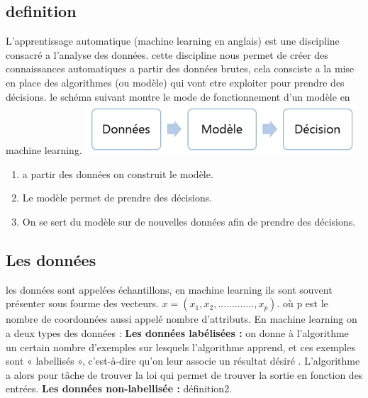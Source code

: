 \documentclass[a4paper,12pt]{report}
\begin{document}
\subsection*{definition}
L'apprentissage automatique (machine learning en anglais) est une discipline consacré a l'analyse des données. cette discipline nous permet de créer des connaissances automatiques a partir des données brutes, cela consciste a la mise en place des algorithmes (ou modèle) qui vont etre exploiter pour prendre des décisions.\newline
le schéma suivant montre le mode de fonctionnement d'un modèle en machine learning.\newline
\hspace*{4cm}\includegraphics[scale=1]{m_learning.png} 
 \begin{enumerate}
 \item a partir des données on construit le modèle.
 \item Le modèle permet de prendre des décisions.
 \item On se sert du modèle sur de nouvelles données afin de prendre des décisions.
 \end{enumerate}
\subsection{Les données}
les données sont appelées échantillons, en machine learning ils sont souvent présenter sous fourme des vecteurs.\newline
$x=(x_1, x_2,.............,x_p).$\newline
où p est le nombre de coordonnées aussi appelé nombre d’attributs.\newline
En machine learning on a deux types des données :\newline
\newline
\textbf{Les données labélisées :} on donne à l’algorithme un certain nombre d’exemples sur lesquels l'algorithme  apprend, et ces exemples sont « labellisés », c’est-à-dire qu’on leur associe un résultat désiré . L’algorithme a alors pour tâche de trouver la loi qui permet de trouver la sortie en fonction des entrées.\newline
\newline 
\textbf{Les données non-labellisée :} définition2.
\end{document}
